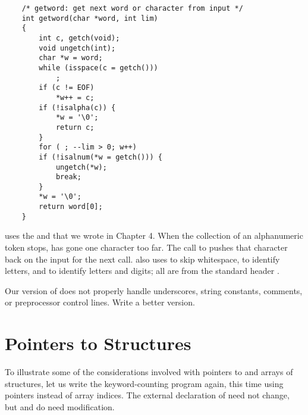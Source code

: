 \begin{lstlisting}
	/* getword: get next word or character from input */
	int getword(char *word, int lim)
	{
		int c, getch(void);
		void ungetch(int);
		char *w = word;
		while (isspace(c = getch()))
			;
		if (c != EOF)
			*w++ = c;
		if (!isalpha(c)) {
			*w = '\0';
			return c;
		}
		for ( ; --lim > 0; w++)
		if (!isalnum(*w = getch())) {
			ungetch(*w);
			break;
		}
		*w = '\0';
		return word[0];
	}
\end{lstlisting}

 uses the  and  that we wrote in Chapter 4.
When the collection of an alphanumeric token stops,  has gone one character too far.
The call to  pushes that character back on the input for the next call.
 also uses  to skip whitespace,  to identify letters, and  to identify letters and digits; all are from the standard header .
\newline

\begin{ExerciseList}
\Exercise Our version of  does not properly handle underscores, string constants, comments, or preprocessor control lines. Write a better version.
\end{ExerciseList}



\section{Pointers to Structures}

To illustrate some of the considerations involved with pointers to and arrays of structures, let us write the keyword-counting program again, this time using pointers instead of array indices.
The external declaration of  need not change, but  and  do need modification.

